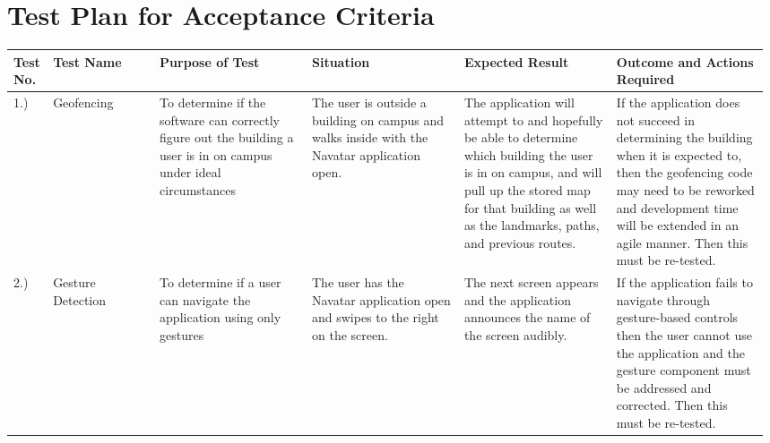 \documentclass{scrreprt}
\begin{document}
\begin{table}[h]

\section{Test Plan for Acceptance Criteria}
\centering
\begin{tabular}{|p{0.04\linewidth}|p{0.14\linewidth}|p{0.2\linewidth}|p{0.2\linewidth}|p{0.2\linewidth}|p{0.2\linewidth}|}
\hline
\rowcolor[HTML]{329A9D} 
Test No.                    & Test Name                  & Purpose of Test                                                                                                                           & Situation                                                                                                                                                                                                      & Expected Result                                                                                                                                                                                                     & Outcome and Actions Required                                                                                                                                                                                                    \\ \hline
\cellcolor[HTML]{9B9B9B}1.) & Geofencing                 & To determine if the software can correctly figure out the building a user is in on campus under ideal circumstances                       & The user is outside a building on campus and walks inside with the Navatar application open.                                                                                                                   & The application will attempt to and hopefully be able to determine which building the user is in on campus, and will pull up the stored map for that building as well as the landmarks, paths, and previous routes. & If the application does not succeed in determining the building when it is expected to, then the geofencing code may need to be reworked and development time will be extended in an agile manner. Then this must be re-tested. \\ \hline
\cellcolor[HTML]{9B9B9B}2.) & Gesture Detection          & To determine if a user can navigate the application using only gestures                                                                   & The user has the Navatar application open and swipes to the right on the screen.                                                                                                                               & The next screen appears and the application announces the name of the screen audibly.                                                                                                                               & If the application fails to navigate through gesture-based controls then the user cannot use the application and the gesture component must be addressed and corrected. Then this must be re-tested.                            \\ \hline

\end{tabular}
\end{table}
\end{document}
